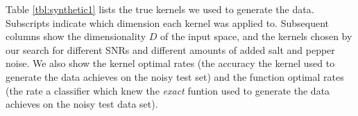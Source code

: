 \documentclass[a4paper,12pt ]{report}
\begin{document}
Table \ref{tbl:synthetic1}  lists the true kernels we used to generate the data.  Subscripts indicate which dimension each kernel was applied to.  Subsequent columns show the dimensionality $D$ of the input space, and the kernels chosen by our search for different SNRs and different amounts of added salt and pepper noise. 
We also show the kernel optimal rates (the accuracy the kernel used to generate the data achieves on the noisy test set) and the function optimal rates (the rate a classifier which knew the \emph{exact} funtion used to generate the data achieves on the noisy test data set). 



\begin{table}[h]

\caption{{ True kernel: $ \SE_1 + \SE_2 + \SE_3$, $D$ = 3.           }}

\label{tbl:synthetic1}


\begin{center}
{\small
{}}
\end{center}
\end{table}
\end{document}
